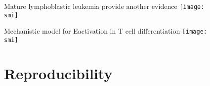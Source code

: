 \documentclass[10pt]{beamer}
\def\smi{out/ln/updir/mw-gcthesis-oral/library.bib}
\begin{document}
\begin{frame}{Mature lymphoblastic leukemia provide another evidence}
  \def\smi{out/ln/updir/mw-gcthesis-oral/ink/tall/H3K27ac_HOXA5-9_TLX1_TLX3_ealpha_barplot.png}
  \texttt{[image: \\smi]}%
\end{frame}
\begin{frame}{Mechanistic model for E\textalpha activation in T cell differentiation}
  \def\smi{out/ln/updir/mw-gcthesis-oral/ink/Highlight_HOXA_Blueprint_paper.pdf}
  \texttt{[image: \\smi]}%
\end{frame}
\section{Reproducibility}
\begin{frame}
\end{frame}
\end{document}
